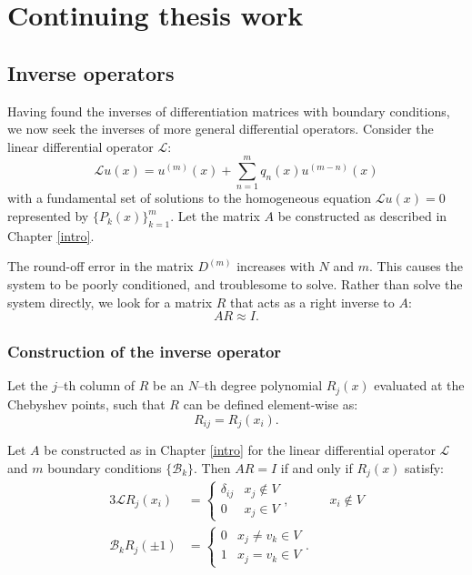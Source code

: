 \documentclass{book}
\begin{document}
\chapter{Continuing thesis work}

\section{Inverse operators}

Having found the inverses of differentiation matrices with boundary conditions, we now seek the inverses of more general differential operators.
Consider the linear differential operator $\mathcal{L}$:
\begin{equation}
\mathcal{L} u(x) = u^{(m)}(x) + \sum_{n = 1}^m q_n(x) u^{(m-n)}(x)
\end{equation}
with a fundamental set of solutions to the homogeneous equation $\mathcal{L} u(x) = 0$ represented by $\{ P_k(x) \}_{k=1}^m$.
Let the matrix $A$ be constructed as described in Chapter \ref{intro}.

The round-off error in the matrix $D^{(m)}$ increases with $N$ and $m$.
This causes the system to be poorly conditioned, and troublesome to solve.
Rather than solve the system directly, we look for a matrix $R$ that acts as a right inverse to $A$:
\begin{equation}
A R \approx I.
\end{equation}

\subsection{Construction of the inverse operator}

Let the $j$--th column of $R$ be an $N$--th degree polynomial $R_j(x)$ evaluated at the Chebyshev points, such that $R$ can be defined element-wise as:
\begin{equation}
R_{ij} = R_j(x_i) .
\end{equation}

\begin{lemma}
Let $A$ be constructed as in Chapter \ref{intro} for the linear differential operator $\mathcal{L}$ and $m$ boundary conditions $\{ \mathcal{B}_k \}$.
Then $AR = I$ if and only if $R_j(x)$ satisfy:
\begin{alignat}{3} \label{inverse conditions}
\mathcal{L} R_j(x_i) & = \begin{cases} \delta_{ij} & x_j \notin V \\ 0 & x_j \in V \end{cases}, && x_i \notin V \\
\mathcal{B}_k R_j(\pm 1) & = \begin{cases} 0 & x_j \neq v_k \in V \\ 1 & x_j = v_k \in V \end{cases} .
\end{alignat}
\end{lemma}
\end{document}
